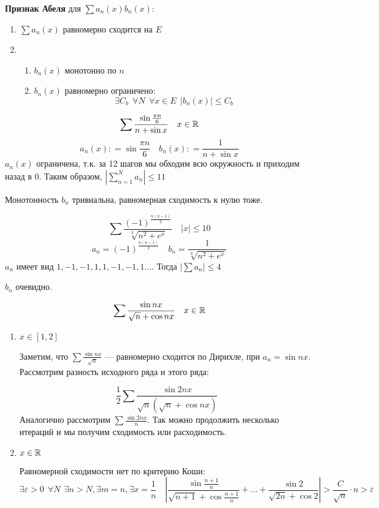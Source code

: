 \textbf{Признак Абеля} для \(\sum a_n(x)b_n(x)\):
\begin{enumerate}
    \item \(\sum a_n(x)\) равномерно сходится на \(E\)
    \item \begin{enumerate}
              \item \(b_n(x)\) монотонно по \(n\)
              \item \(b_n(x)\) равномерно ограничено:
                    \[\exists C_b \ \ \forall N \ \ \forall x\in E \ \ |b_n(x)| \leq C_b\]
          \end{enumerate}
\end{enumerate}

\begin{exercise}
    \[\sum \frac{\sin \frac{\pi n}{6} }{n + \sin x} \quad x\in \mathbb{R} \]
    \[a_n(x) : = \sin \frac{\pi n}{6} \quad b_n(x) : = \frac{1}{n + \sin x}\]
    \(a_n(x)\) ограничена, т.к. за 12 шагов мы обходим всю окружность и приходим назад в \(0\). Таким образом, \(\left|\sum_{n = 1}^N a_n\right| \leq 11\)

    Монотонность \(b_n\) тривиальна, равномерная сходимость к нулю тоже.
\end{exercise}

\begin{exercise}
    \[\sum \frac{( - 1)^{\frac{n(n - 1)}{2} }}{\sqrt[3]{n^2 + e^x}} \quad |x| \leq 10 \]
    \[a_n = ( - 1)^{\frac{n(n - 1)}{2} } \quad b_n = \frac{1}{\sqrt[3]{n^2 + e^x}}\]
    \(a_n\) имеет вид \(1, - 1, - 1, 1, 1, - 1, - 1, 1 \dots \). Тогда \(\left|\sum a_n\right| \leq 4\)

    \(b_n\) очевидно.
\end{exercise}

\begin{exercise}
    \[\sum \frac{\sin nx}{\sqrt{n} + \cos nx} \quad x\in\mathbb{R}\]
    \begin{enumerate}
        \item \(x\in[1, 2]\)

              Заметим, что \(\sum \frac{\sin nx}{\sqrt{n}} \) --- равномерно сходится по Дирихле, при \(a_n = \sin nx\). Рассмотрим разность исходного ряда и этого ряда:

              \[\frac{1}{2}\sum \frac{\sin 2nx}{\sqrt{n}(\sqrt{n} + \cos nx)} \]
              Аналогично рассмотрим \(\sum \frac{\sin 2nx}{n} \). Так можно продолжить несколько итераций и мы получим сходимость или расходимость.
        \item \(x\in\mathbb{R}\)

              Равномерной сходимости нет по критерию Коши:
              \[\exists \varepsilon > 0 \ \ \forall N \ \ \exists n > N, \exists m = n, \exists x = \frac{1}{n} \quad  \left|\frac{\sin \frac{n + 1}{n} }{\sqrt{n + 1} + \cos \frac{n + 1}{n}} + \dots + \frac{\sin 2}{\sqrt{2n} + \cos 2}  \right| > \frac{C}{\sqrt{n}} \cdot n > \varepsilon\]
    \end{enumerate}
\end{exercise}

